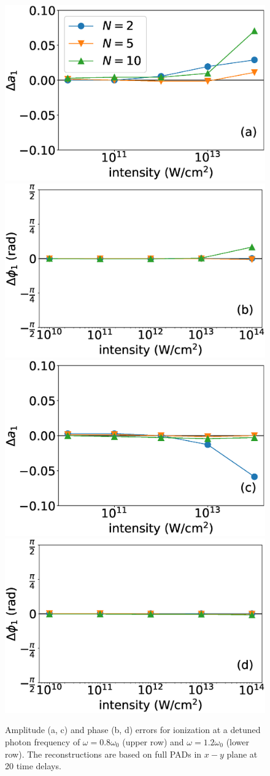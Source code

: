 \begin{figure}[!ht]
\centering
\includegraphics[width=0.49\linewidth]{figs/Photo_ionization/superpositions/Venzke_new_fig_6a.eps}
\includegraphics[width=0.49\linewidth]{figs/Photo_ionization/superpositions/Venzke_new_fig_6b.eps}
\includegraphics[width=0.49\linewidth]{figs/Photo_ionization/superpositions/Venzke_new_fig_6c.eps}
\includegraphics[width=0.49\linewidth]{figs/Photo_ionization/superpositions/Venzke_new_fig_6d.eps} 
\caption{
Amplitude (a, c) and phase (b, d) errors for ionization at a detuned photon frequency of $\omega=0.8\omega_0$ (upper row) and $\omega=1.2\omega_0$ (lower row). The reconstructions are based on full PADs in $x-y$ plane at 20 time delays.
} 
  \label{fig:detuned}
\end{figure}

